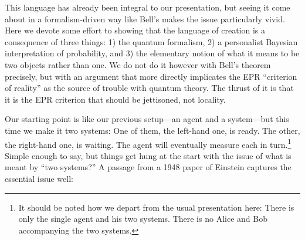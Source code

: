 This language has already been integral to our presentation, but seeing it come about in a formalism-driven way like Bell's makes the issue particularly vivid.  Here we devote some effort to showing that the language of creation is a consequence of three things:  1) the quantum formalism, 2) a personalist Bayesian interpretation of probability, and 3) the elementary notion of what it means to be two objects rather than one.  We do not do it however with Bell's theorem precisely, but with an argument that more directly implicates the EPR ``criterion of reality'' as the source of trouble with quantum theory.  The thrust of it is that it is the EPR criterion that should be jettisoned, not locality.

Our starting point is like our previous setup---an agent and a system---but this time we make it two systems:  One of them, the left-hand one, is ready. The other, the right-hand one, is waiting.  The agent will eventually measure each in turn.\footnote{It should be noted how we depart from the usual presentation here:  There is only the single agent and his two systems.  There is no Alice and Bob accompanying the two systems.}  Simple enough to say, but things get hung at the start with the issue of what is meant by ``two systems?''  A passage from a 1948 paper of Einstein \cite{Einstein48} captures the essential issue well:
